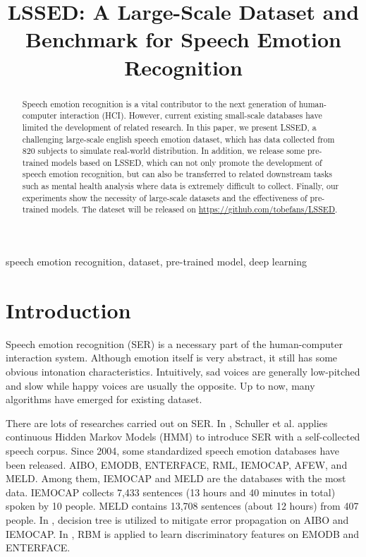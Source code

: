 \documentclass{article}
\title{LSSED: A Large-Scale Dataset and Benchmark for Speech Emotion Recognition}
\begin{document}
\maketitle
\begin{abstract}
Speech emotion recognition is  a vital  contributor to the next generation of human-computer interaction (HCI).
However, current existing small-scale databases have limited the development of related research.
In this paper, we present LSSED, a challenging large-scale english speech emotion dataset, which has data collected from 820 subjects to simulate real-world distribution.
In addition, we release some pre-trained models based on LSSED, which can not only promote the development of speech emotion recognition, but can also be transferred to related downstream tasks such as mental health analysis where data is extremely difficult to collect.
Finally, our experiments show the necessity of large-scale datasets and the effectiveness of pre-trained models.
The dateset will be released on \url{https://github.com/tobefans/LSSED}.

\end{abstract}
\begin{keywords}
speech emotion recognition, dataset, pre-trained model, deep learning
\end{keywords}
\section{Introduction}
\label{sec:intro}
Speech emotion recognition (SER) is a necessary part of the human-computer interaction system.
Although emotion itself is very abstract, it still has some obvious intonation characteristics.
Intuitively, sad voices are generally low-pitched and slow while happy voices are usually the opposite.
Up to now, many algorithms have emerged for existing dataset.


There are lots of researches carried out on SER.
In \cite{schuller2003hidden}, Schuller et al. applies continuous Hidden Markov Models (HMM) to introduce SER with a self-collected speech corpus.
Since 2004, some standardized speech emotion databases have been released. AIBO\cite{batliner2004you}, EMODB\cite{burkhardt2005database}, ENTERFACE\cite{martin2006enterface}, RML\cite{wang2008recognizing}, IEMOCAP\cite{busso2008iemocap}, AFEW\cite{dhall2012collecting}, and MELD\cite{poria2018meld}.
Among them, IEMOCAP\cite{busso2008iemocap} and MELD\cite{poria2018meld} are the databases with the most data.
IEMOCAP\cite{busso2008iemocap} collects 7,433 sentences (13 hours and 40 minutes in total) spoken by 10 people. MELD\cite{poria2018meld} contains 13,708 sentences (about 12 hours) from 407 people.
In \cite{lee2011emotion}, decision tree is utilized to mitigate error propagation on AIBO\cite{batliner2004you} and IEMOCAP\cite{busso2008iemocap}.
In \cite{stuhlsatz2011deep}, RBM is applied to learn discriminatory features on EMODB\cite{burkhardt2005database} and ENTERFACE\cite{martin2006enterface}.
\end{document}
